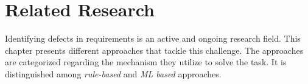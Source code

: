 \chapter{Related Research}
\label{chp:related_research}
Identifying defects in requirements is an active and ongoing research field.
This chapter presents different approaches that tackle this challenge.
The approaches are categorized regarding the mechanism they utilize to solve the task.
It is distinguished among \textit{rule-based} and \textit{\ac{ML} based} approaches.



